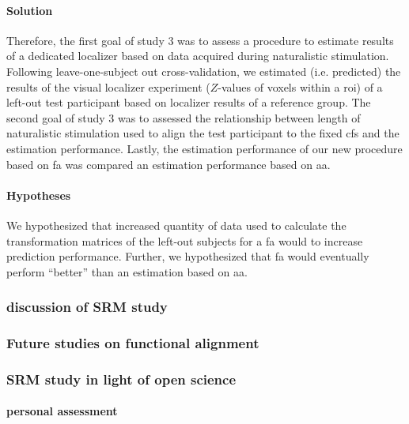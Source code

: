 \paragraph{Solution}
%
Therefore, the first goal of study 3 was to assess a procedure to estimate
results of a dedicated localizer \citep{sengupta2016extension} based on data
acquired during naturalistic stimulation.
%
Following leave-one-subject out cross-validation, we estimated (i.e. predicted)
the results of the visual localizer experiment ($Z$-values of voxels within a
\ac{roi}) of a left-out test participant based on localizer results of a
reference group.
The second goal of study 3 was to assessed the relationship between length of
naturalistic stimulation used to align the test participant to the fixed
\ac{cfs} and the estimation performance.
%
Lastly, the estimation performance of our new procedure based on \ac{fa} was
compared an estimation performance based on \ac{aa}.


\paragraph{Hypotheses}
%
We hypothesized that increased quantity of data used to calculate the
transformation matrices of the left-out subjects for a \ac{fa} would to increase
prediction performance.
%
Further, we hypothesized that \ac{fa} would eventually perform
``better'' than an estimation based on \ac{aa}.


\subsubsection{discussion of SRM study}



\subsubsection{Future studies on functional alignment}


\subsubsection{SRM study in light of open science}


\paragraph{personal assessment}



